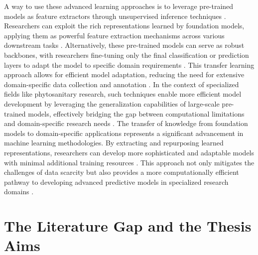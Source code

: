 \documentclass[12pt,a4paper,oneside]{report}
\begin{document}
A way to use these advanced learning approaches is to leverage pre-trained models as feature extractors through unsupervised 
inference techniques \cite{chen_simple_2020}. Researchers can exploit the rich representations learned by foundation models, 
applying them as powerful feature extraction mechanisms across various downstream tasks \cite{devlin_bert_2019}. Alternatively, 
these pre-trained models can serve as robust backbones, with researchers fine-tuning only the final classification or 
prediction layers to adapt the model to specific domain requirements \cite{he_momentum_2020}. This transfer learning 
approach allows for efficient model adaptation, reducing the need for extensive domain-specific data collection and 
annotation \cite{kornblith_better_2019}. In the context of specialized fields like phytosanitary research, such 
techniques enable more efficient model development by leveraging the generalization capabilities of large-scale 
pre-trained models, effectively bridging the gap between computational limitations and domain-specific research 
needs \cite{razavian_cnn_2014}.
The transfer of knowledge from foundation models to domain-specific applications represents a significant advancement 
in machine learning methodologies. By extracting and repurposing learned representations, researchers can develop 
more sophisticated and adaptable models with minimal additional training resources \cite{zoph_rethinking_2020}. 
This approach not only mitigates the challenges of data scarcity but also provides a more computationally 
efficient pathway to developing advanced predictive models in specialized research domains \cite{tan_efficientnet_2020}.

\section{The Literature Gap and the Thesis Aims}


\end{document}
